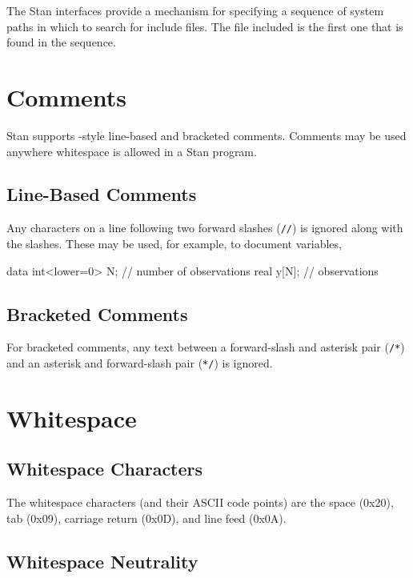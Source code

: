 The Stan interfaces provide a mechanism for specifying a sequence of
system paths in which to search for include files.  The file included
is the first one that is found in the sequence.

\section{Comments}\label{comments.section}

Stan supports \Cpp-style line-based and bracketed comments.  Comments
may be used anywhere whitespace is allowed in a Stan program.

\subsection{Line-Based Comments}

Any characters on a line following two forward slashes (\Verb|//|) is
ignored along with the slashes.  These may be used, for example, to
document variables,
%
\begin{stancode}
data {
  int<lower=0> N;  // number of observations
  real y[N];  // observations
}
\end{stancode}

\subsection{Bracketed Comments}

For bracketed comments, any text between a forward-slash and asterisk
pair (\Verb|/*|) and an asterisk and forward-slash pair (\Verb|*/|) is
ignored.



\section{Whitespace}

\subsection{Whitespace Characters}

The whitespace characters (and their ASCII code points) are the space
(0x20), tab (0x09), carriage return (0x0D), and line feed (0x0A).

\subsection{Whitespace Neutrality}

